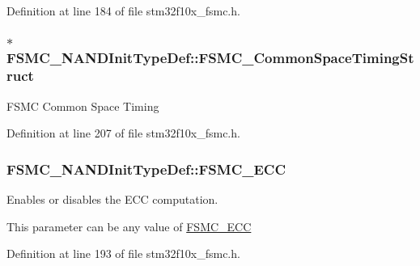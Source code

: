 Definition at line 184 of file stm32f10x\-\_\-fsmc.\-h.

\hypertarget{struct_f_s_m_c___n_a_n_d_init_type_def_a8ec59d3e29ae3206301ec47d63dfc7ad}{
\subsubsection[{F\-S\-M\-C\-\_\-\-Common\-Space\-Timing\-Struct}]{ $\ast$ F\-S\-M\-C\-\_\-\-N\-A\-N\-D\-Init\-Type\-Def\-::\-F\-S\-M\-C\-\_\-\-Common\-Space\-Timing\-Struct}}\label{struct_f_s_m_c___n_a_n_d_init_type_def_a8ec59d3e29ae3206301ec47d63dfc7ad}
F\-S\-M\-C Common Space Timing 

Definition at line 207 of file stm32f10x\-\_\-fsmc.\-h.

\hypertarget{struct_f_s_m_c___n_a_n_d_init_type_def_a58d0510c0ce0ae3d1e3863bf8f571377}{
\subsubsection[{F\-S\-M\-C\-\_\-\-E\-C\-C}]{ F\-S\-M\-C\-\_\-\-N\-A\-N\-D\-Init\-Type\-Def\-::\-F\-S\-M\-C\-\_\-\-E\-C\-C}}\label{struct_f_s_m_c___n_a_n_d_init_type_def_a58d0510c0ce0ae3d1e3863bf8f571377}
\begin{DoxyVerb}              Enables or disables the ECC computation.
\end{DoxyVerb}
 This parameter can be any value of \hyperlink{group___f_s_m_c___e_c_c}{F\-S\-M\-C\-\_\-\-E\-C\-C} 

Definition at line 193 of file stm32f10x\-\_\-fsmc.\-h.

